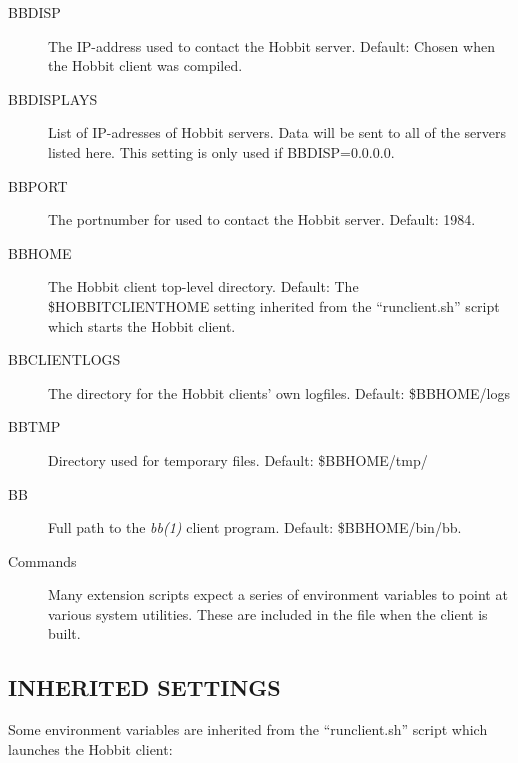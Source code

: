 \begin{description}

\item[BBDISP] The IP-address used to contact the Hobbit
  server. Default: Chosen when the Hobbit client was compiled. 


 

\item[BBDISPLAYS] List of IP-adresses of Hobbit servers. Data will be
  sent to all of the servers listed here. This setting is only used if
  BBDISP=0.0.0.0. 


 

\item[BBPORT] The portnumber for used to contact the Hobbit server. Default: 1984. 

 

\item[BBHOME] The Hobbit client top-level directory. Default: The
  \$HOBBITCLIENTHOME setting inherited from the ``runclient.sh''
  script which starts the Hobbit client. 


 

\item[BBCLIENTLOGS] The directory for the Hobbit clients' own logfiles. Default: \$BBHOME/logs 

 

\item[BBTMP] Directory used for temporary files. Default: \$BBHOME/tmp/ 

 

\item[BB] Full path to the \emph{bb(1)}
 client program. Default: \$BBHOME/bin/bb. 

 

\item[Commands] Many extension scripts expect a series of environment
  variables to point at various system utilities. These are included
  in the file when the client is built. 



\end{description}

\subsection{INHERITED SETTINGS}
 Some environment variables are inherited from the ``runclient.sh'' script which launches the Hobbit client: 


